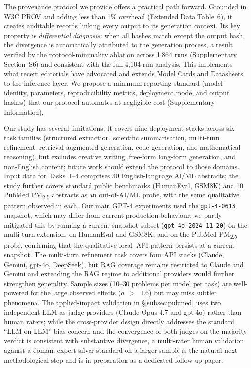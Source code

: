 \documentclass[sn-nature]{sn-jnl}
\begin{document}
The provenance protocol we provide offers a practical path forward.
Grounded in W3C PROV\cite{w3cprov2013} and adding less than 1\% overhead (Extended Data Table~6), it creates auditable records linking every output to its generation context.
Its key property is \emph{differential diagnosis}: when all hashes match except the output hash, the divergence is automatically attributed to the generation process, a result verified by the protocol-minimality ablation across 1{,}864 runs (Supplementary Section~S6) and consistent with the full 4{,}104-run analysis.
This implements what recent editorials have advocated\cite{editorial2024framework} and extends Model Cards\cite{mitchell2019model} and Datasheets\cite{gebru2021datasheets} to the inference layer.
We propose a minimum reporting standard (model identity, parameters, reproducibility metrics, deployment mode, and output hashes) that our protocol automates at negligible cost (Supplementary Information).

Our study has several limitations.
It covers nine deployment stacks across six task families (structured extraction, scientific summarisation, multi-turn refinement, retrieval-augmented generation, code generation, and mathematical reasoning), but excludes creative writing, free-form long-form generation, and non-English content; future work should extend the protocol to those domains.
Input data for Tasks~1--4 comprises 30 English-language AI/ML abstracts; the study further covers standard public benchmarks (HumanEval, GSM8K) and 10 PubMed PM\textsubscript{2.5} abstracts as an out-of-AI/ML probe, with the same qualitative pattern observed in each.
Our main GPT-4 experiments used the \texttt{gpt-4-0613} snapshot, which may differ from current production behaviour; we partly mitigated this by running a current-snapshot subset (\texttt{gpt-4o-2024-11-20}) on the multi-turn extension, on HumanEval and GSM8K, and on the PubMed PM\textsubscript{2.5} probe, confirming that the qualitative local--API pattern persists at a current snapshot.
The multi-turn refinement task covers four API stacks (Claude, Gemini, gpt-4o, DeepSeek), but RAG coverage remains restricted to Claude and Gemini and extending the RAG regime to additional providers would further strengthen generality.
Sample sizes (10--30 problems per model per task) are well-powered for the large observed effects ($d$~$>$~1.6) but may miss subtler phenomena.
The applied-impact validation in §\ref{subsec:pubmed} uses two independent LLM-as-judge providers (Claude Opus 4.7 and gpt-4o) rather than human raters; while the cross-provider design directly addresses the standard ``LLM-on-LLM'' bias concern and the convergence of both judges on the majority verdict is consistent with substantive divergence, a multi-rater human validation against a domain-expert silver standard on a larger sample is the natural next methodological step and is in preparation as a dedicated follow-up paper.
\end{document}
